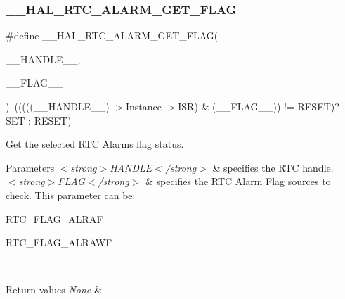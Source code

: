 \subsubsection{\texorpdfstring{\+\_\+\+\_\+\+H\+A\+L\+\_\+\+R\+T\+C\+\_\+\+A\+L\+A\+R\+M\+\_\+\+G\+E\+T\+\_\+\+F\+L\+AG}{\_\_HAL\_RTC\_ALARM\_GET\_FLAG}}
{\footnotesize\ttfamily \#define \+\_\+\+\_\+\+H\+A\+L\+\_\+\+R\+T\+C\+\_\+\+A\+L\+A\+R\+M\+\_\+\+G\+E\+T\+\_\+\+F\+L\+AG(\begin{DoxyParamCaption}\item[{}]{\+\_\+\+\_\+\+H\+A\+N\+D\+L\+E\+\_\+\+\_\+,  }\item[{}]{\+\_\+\+\_\+\+F\+L\+A\+G\+\_\+\+\_\+ }\end{DoxyParamCaption})~(((((\+\_\+\+\_\+\+H\+A\+N\+D\+L\+E\+\_\+\+\_\+)-\/$>$Instance-\/$>$I\+SR) \& (\+\_\+\+\_\+\+F\+L\+A\+G\+\_\+\+\_\+)) != R\+E\+S\+ET)? S\+ET \+: R\+E\+S\+ET)}



Get the selected R\+TC Alarm\textquotesingle{}s flag status. 


\begin{DoxyParams}{Parameters}
{\em $<$strong$>$\+H\+A\+N\+D\+L\+E$<$/strong$>$} & specifies the R\+TC handle. \\
\hline
{\em $<$strong$>$\+F\+L\+A\+G$<$/strong$>$} & specifies the R\+TC Alarm Flag sources to check. This parameter can be\+: \begin{DoxyItemize}
\item R\+T\+C\+\_\+\+F\+L\+A\+G\+\_\+\+A\+L\+R\+AF \item R\+T\+C\+\_\+\+F\+L\+A\+G\+\_\+\+A\+L\+R\+A\+WF \end{DoxyItemize}
\\
\hline
\end{DoxyParams}

\begin{DoxyRetVals}{Return values}
{\em None} & \\
\hline
\end{DoxyRetVals}
\mbox{\label{group___r_t_c___exported___macros_gaf748b95b91cca959f79f441a90678c60}} 
